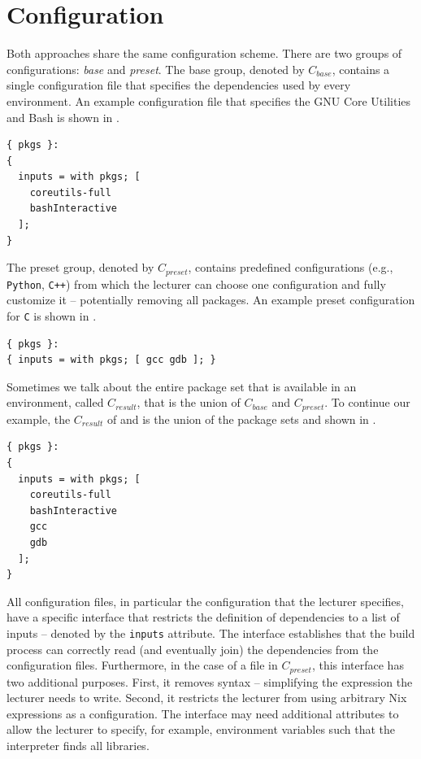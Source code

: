 \section{Configuration}\label{prototype-configuration}
Both approaches share the same configuration scheme. There are two groups of configurations: \emph{base} and \emph{preset}. The base group, denoted by $C_{base}$, contains a single configuration file that specifies the dependencies used by every environment. An example configuration file that specifies the GNU Core Utilities and Bash is shown in . 
\begin{lstlisting}[caption={base.nix}, title={base.nix}, label={base.nix}]
{ pkgs }:
{
  inputs = with pkgs; [ 
    coreutils-full 
    bashInteractive 
  ];
}
\end{lstlisting}
The preset group, denoted by $C_{preset}$, contains predefined configurations (e.g., \verb|Python|, \verb|C++|) from which the lecturer can choose one configuration and fully customize it -- potentially removing all packages. An example preset configuration for \verb|C| is shown in . 
\begin{lstlisting}[caption={preset.nix}, title={preset.nix}, label={preset.nix}]
{ pkgs }:
{ inputs = with pkgs; [ gcc gdb ]; }
\end{lstlisting}
Sometimes we talk about the entire package set that is available in an environment, called $C_{result}$, that is the union of $C_{base}$ and $C_{preset}$. To continue our example, the $C_{result}$ of  and  is the union of the package sets and shown in .
\begin{lstlisting}[caption={result.nix}, title={result.nix}, label={result.nix}]
{ pkgs }:
{
  inputs = with pkgs; [
    coreutils-full
    bashInteractive
    gcc
    gdb
  ];
}
\end{lstlisting}
All configuration files, in particular the configuration that the lecturer specifies, have a specific interface that restricts the definition of dependencies to a list of inputs -- denoted by the \verb|inputs| attribute. The interface establishes that the build process can correctly read (and eventually join) the dependencies from the configuration files. Furthermore, in the case of a file in $C_{preset}$, this interface has two additional purposes. First, it removes syntax -- simplifying the expression the lecturer needs to write. Second, it restricts the lecturer from using arbitrary Nix expressions as a configuration. The interface may need additional attributes to allow the lecturer to specify, for example, environment variables such that the interpreter finds all libraries.

